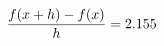 \documentclass[preview]{standalone}
\begin{document}
\begin{align*}
\special{dvisvgm:raw <g id='unique000'>}\frac{f(x+h)-f(x)}{h} = 2.155\special{dvisvgm:raw </g>}
\end{align*}
\end{document}
